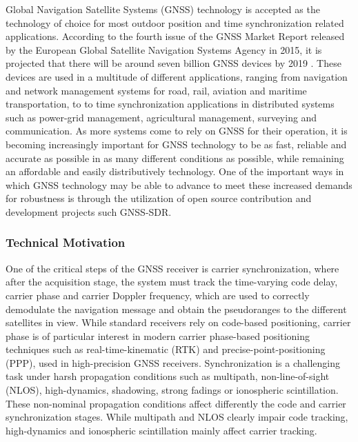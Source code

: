 Global Navigation Satellite Systems (GNSS) technology is accepted as the technology of choice for most outdoor position and time synchronization related applications. According to the fourth issue of the GNSS Market Report released by the European Global Satellite Navigation Systems Agency in 2015, it is projected that there will be around seven billion GNSS devices by 2019 \cite{GNSS_MR}. These devices are used in a multitude of different applications, ranging from navigation and network management systems for road, rail, aviation and maritime transportation, to to time synchronization applications in distributed systems such as power-grid management, agricultural management, surveying and communication. As more systems come to rely on GNSS for their operation, it is becoming increasingly important for GNSS technology to be as fast, reliable and accurate as possible in as many different conditions as possible, while remaining an affordable and easily distributively technology. One of the important ways in which GNSS technology may be able to advance to meet these increased demands for robustness is through the utilization of open source contribution and development projects such GNSS-SDR.

\subsubsection{Technical Motivation}

One of the critical steps of the GNSS receiver is carrier synchronization, where after the acquisition stage, the system must track the time-varying code delay, carrier phase and carrier Doppler frequency, which are used to correctly demodulate the navigation message and obtain the pseudoranges to the different satellites in view. While standard receivers rely on code-based positioning, carrier phase is of particular interest in modern carrier phase-based positioning techniques such as real-time-kinematic (RTK) and precise-point-positioning (PPP), used in high-precision GNSS receivers. Synchronization is a challenging task under harsh propagation conditions such as multipath, non-line-of-sight (NLOS), high-dynamics, shadowing, strong fadings or ionospheric scintillation. These non-nominal propagation conditions affect differently the code and carrier synchronization stages. While multipath and NLOS clearly impair code tracking, high-dynamics and ionospheric scintillation mainly affect carrier tracking. %

